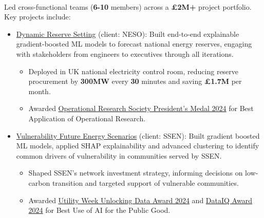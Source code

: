 \documentclass{my_cv}
\begin{document}
%
{
\\ Led cross-functional teams (\textbf{6-10} members) across a \textbf{£2M+} project portfolio. Key projects include:\begin{itemize}[topsep=2pt,itemsep=3pt,partopsep=0pt, parsep=0pt]  
	\item \href{https://www.smithinst.co.uk/case-studies/using-explainable-ai-to-reduce-risk-and-improve-efficiency-in-uk-electricity-reserve-setting-2/}{Dynamic Reserve Setting} (client: NESO): Built end-to-end explainable gradient-boosted ML models to forecast national energy reserves, engaging with stakeholders from engineers to executives through all iterations. 
	        \begin{itemize}[topsep=0pt,itemsep=0pt,partopsep=0pt,parsep=0pt]
            \item Deployed in UK national electricity control room, reducing reserve procurement by \textbf{300MW} every \textbf{30} minutes and saving \textbf{£1.7M} per month.
            \item Awarded \href{https://doi.org/10.1080/2058802X.2025.2499378}{Operational Research Society President’s Medal 2024} for Best Application of Operational Research.
        \end{itemize}
    \item \href{https://www.ssen.co.uk/news-views/2024/SSEN-puts-vulnerable-customers-at-heart-of-future-energy-strategy/}{Vulnerability Future Energy Scenarios} (client: SSEN): Built gradient boosted ML models, applied SHAP explainability and advanced clustering to identify common drivers of vulnerability in communities served by SSEN.
    	        \begin{itemize}[topsep=0pt,itemsep=0pt,partopsep=0pt,parsep=0pt]
            \item Shaped SSEN’s network investment strategy, informing decisions on low-carbon transition and targeted support of vulnerable communities. 
            \item Awarded \href{https://www.ssen.co.uk/news-views/2024/SSENs-innovative-net-Zero-programmes-win-big-at-the-2024-Utility-Week-awards/}{Utility Week Unlocking Data Award 2024} and \href{https://www.dataiq.global/award-winner/2024-dataiq-awards-best-use-of-ai-for-the-public-good/}{DataIQ Award 2024} for Best Use of AI for the Public Good.
        \end{itemize}

\end{itemize}}
\end{document}
